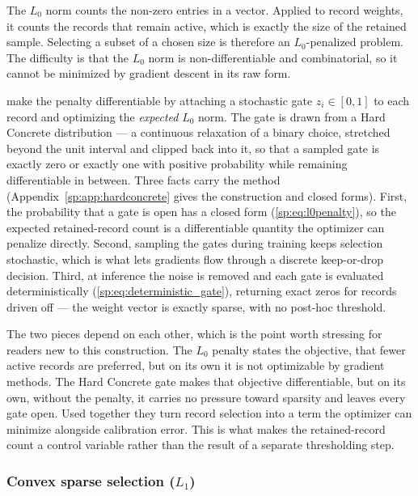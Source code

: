 The $L_0$ norm counts the non-zero entries in a vector. Applied to record weights, it counts the
records that remain active, which is exactly the size of the retained sample. Selecting a subset of
a chosen size is therefore an $L_0$-penalized problem. The difficulty is that the $L_0$ norm is
non-differentiable and combinatorial, so it cannot be minimized by gradient descent in its raw form.

\citet{louizos2018} make the penalty differentiable by attaching a stochastic gate
$z_i \in [0, 1]$ to each record and optimizing the \emph{expected} $L_0$ norm. The gate is drawn
from a Hard Concrete distribution --- a continuous relaxation of a binary choice, stretched beyond
the unit interval and clipped back into it, so that a sampled gate is exactly zero or exactly one
with positive probability while remaining differentiable in between. Three facts carry the method
(Appendix~\ref{sp:app:hardconcrete} gives the construction and closed forms). First, the
probability that a gate is open has a closed form (\autoref{sp:eq:l0penalty}), so the expected
retained-record count is a differentiable quantity the optimizer can penalize directly. Second,
sampling the gates during training keeps selection stochastic, which is what lets gradients flow
through a discrete keep-or-drop decision. Third, at inference the noise is removed and each gate is
evaluated deterministically (\autoref{sp:eq:deterministic_gate}), returning exact zeros for records
driven off --- the weight vector is exactly sparse, with no post-hoc threshold.

The two pieces depend on each other, which is the point worth stressing for readers new to this
construction. The $L_0$ penalty states the objective, that fewer active records are preferred, but
on its own it is not optimizable by gradient methods. The Hard Concrete gate makes that objective
differentiable, but on its own, without the penalty, it carries no pressure toward sparsity and
leaves every gate open. Used together they turn record selection into a term the optimizer can
minimize alongside calibration error. This is what makes the retained-record count a control
variable rather than the result of a separate thresholding step.

\subsubsection{\texorpdfstring{Convex sparse selection ($L_1$)}{Convex sparse selection (L1)}}
\label{sp:sec:l1_background}


